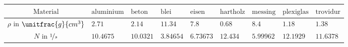 \begin{tabular}{c|*{8}{*{1}{l}}}
$\text{Material}$ & $\text{aluminium}$ & $\text{beton}$ & $\text{blei}$ & $\text{eisen}$ & $\text{hartholz}$ & $\text{messing}$ & $\text{plexiglas}$ & $\text{trovidur}$ \\ \hline
$\rho$ in $\unitfrac{g}{cm^3}$ & $2.71$ & $2.14$ & $11.34$ & $7.8$ & $0.68$ & $8.4$ & $1.18$ & $1.38$ \\ \hline
$N$ in $\nicefrac{1}{s}$ & $10.4675$ & $10.0321$ & $3.84654$ & $6.73673$ & $12.434$ & $5.99962$ & $12.1929$ & $11.6378$\end{tabular}
